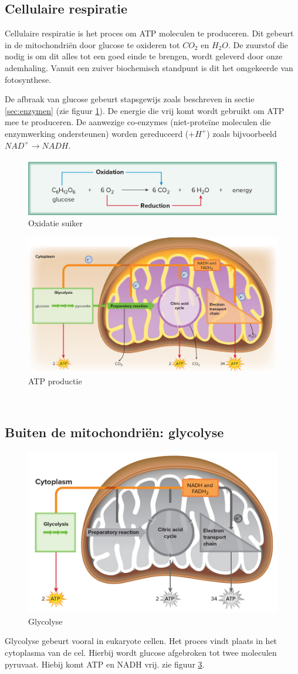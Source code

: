 \documentclass[a4paper,kul]{kulakarticle} %
\begin{document}
\subsection{Cellulaire respiratie}
Cellulaire respiratie is het proces om ATP moleculen te produceren. Dit gebeurt in de mitochondriën door glucose te oxideren tot $CO_2$ en $H_2O$. De zuurstof die nodig is om dit alles tot een goed einde te brengen, wordt geleverd door onze ademhaling. Vanuit een zuiver biochemisch standpunt is dit het omgekeerde van fotosynthese. 

De afbraak van glucose gebeurt stapsgewijs zoals beschreven in sectie \ref{sec:enzymen} (zie figuur \ref{fig:oxidatiesuiker}). De energie die vrij komt wordt gebruikt om ATP mee te produceren. De aanwezige co-enzymes (niet-proteïne moleculen die enzymwerking ondersteunen) worden gereduceerd ($+H^+$) zoals bijvoorbeeld $NAD^+ \rightarrow NADH$.
\begin{figure}[h]
	\centering
	\includegraphics[width=0.7\linewidth]{OxidatieSuiker}
	\caption[Oxidatie suiker]{Oxidatie suiker}
	\label{fig:oxidatiesuiker}
\end{figure}
\begin{figure}[h]
	\centering
	\includegraphics[width=0.7\linewidth]{ATPProductie}
	\caption[ATP productie]{ATP productie}
	\label{fig:atpproductie}
\end{figure}\\
\newpage
\subsection{Buiten de mitochondriën: glycolyse}
\begin{figure}[h]
	\centering
	\includegraphics[width=0.5\linewidth]{MitochondriaGlycolyse}
	\caption[Glycolyse]{Glycolyse}
	\label{fig:mitochondriaglycolyse}
\end{figure}
Glycolyse gebeurt vooral in eukaryote cellen. Het proces vindt plaats in het cytoplasma van de cel. Hierbij wordt glucose afgebroken tot twee moleculen pyruvaat. Hiebij komt ATP en NADH vrij. zie figuur \ref{fig:mitochondriaglycolyse}.
\end{document}
